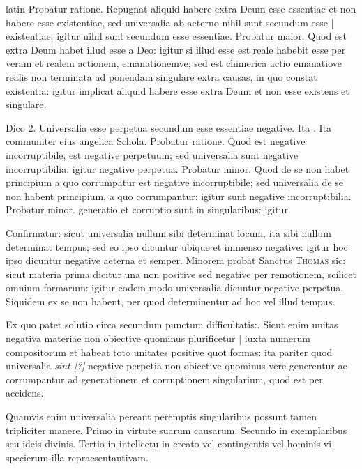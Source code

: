 \begin{otherlanguage*}{latin}
\pstart
Probatur ratione. Repugnat aliquid habere extra Deum esse essentiae et non habere esse existentiae, sed universalia ab aeterno nihil sunt secundum esse \textnormal{|} existentiae:
igitur nihil sunt secundum esse essentiae. Probatur maior. Quod est extra Deum habet illud esse a Deo:
igitur si illud esse est reale habebit esse per veram et realem actionem, emanationemve; sed est chimerica actio emanatiove realis non terminata ad ponendam singulare extra causas, in quo constat existentia:
igitur implicat aliquid habere esse extra Deum et non esse existens et singulare. 
\pend

\pstart
Dico 2. Universalia esse perpetua secundum esse essentiae negative. Ita . Ita communiter eius angelica Schola. Probatur ratione. Quod est negative incorruptibile, est negative perpetuum; sed universalia sunt negative incorruptibilia:
igitur negative perpetua. Probatur minor. Quod de se non habet principium a quo corrumpatur est negative incorruptibile; sed universalia de se non habent principium, a quo corrumpantur:
igitur sunt negative incorruptibilia. Probatur minor. generatio et corruptio sunt in singularibus:
igitur. 
\pend

\pstart
Confirmatur:
sicut universalia nullum sibi determinat locum, ita sibi nullum determinat tempus; sed eo ipso dicuntur ubique et immenso negative:
igitur hoc ipso dicuntur negative aeterna et semper. Minorem probat Sanctus \textsc{Thomas} sic:
sicut materia prima dicitur una non positive sed negative per remotionem, scilicet omnium formarum:
igitur eodem modo universalia dicuntur negative perpetua. Siquidem ex se non habent, per quod determinentur ad hoc vel illud tempus. 
\pend

\pstart
Ex quo patet solutio circa secundum punctum difficultatis:. Sicut enim unitas negativa materiae non obiective quominus plurificetur \textnormal{|} iuxta numerum compositorum et habeat toto unitates positive quot formas:
ita pariter quod universalia \emph{sint [?]} negative perpetia non obiective quominus vere generentur ac corrumpantur ad generationem et corruptionem singularium, quod est per accidens. 
\pend

\pstart
Quamvis enim universalia pereant peremptis singularibus possunt tamen tripliciter manere. Primo in virtute suarum causarum. Secundo in exemplaribus seu ideis divinis. Tertio in intellectu in creato vel contingentis vel hominis vi specierum illa repraesentantivam. 
\pend


\end{otherlanguage*}
